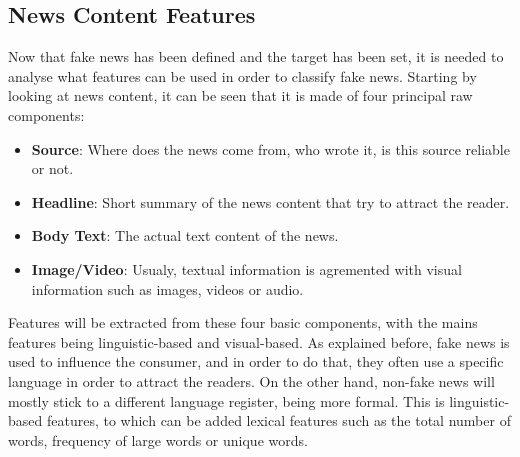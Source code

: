 \subsection{News Content Features}
Now that fake news has been defined and the target has been set, it is needed to analyse what features can be used in order to classify fake news. Starting by looking at news content, it can be seen that it is made of four principal raw components: 
\begin{itemize}
 \item \textbf{Source}: Where does the news come from, who wrote it, is this source reliable or not.
 \item \textbf{Headline}: Short summary of the news content that try to attract the reader.
 \item \textbf{Body Text}: The actual text content of the news.
 \item \textbf{Image/Video}: Usualy, textual information is agremented with visual information such as images, videos or audio.  
\end{itemize}
Features will be extracted from these four basic components, with the mains features being linguistic-based and visual-based. 
As explained before, fake news is used to influence the consumer, and in order to do that, they often use a specific language in order to attract the readers. On the other hand, non-fake news will mostly stick to a different language register, being more formal. This is linguistic-based features, to which can be added lexical features such as the total number of words, frequency of large words or unique words. \\

